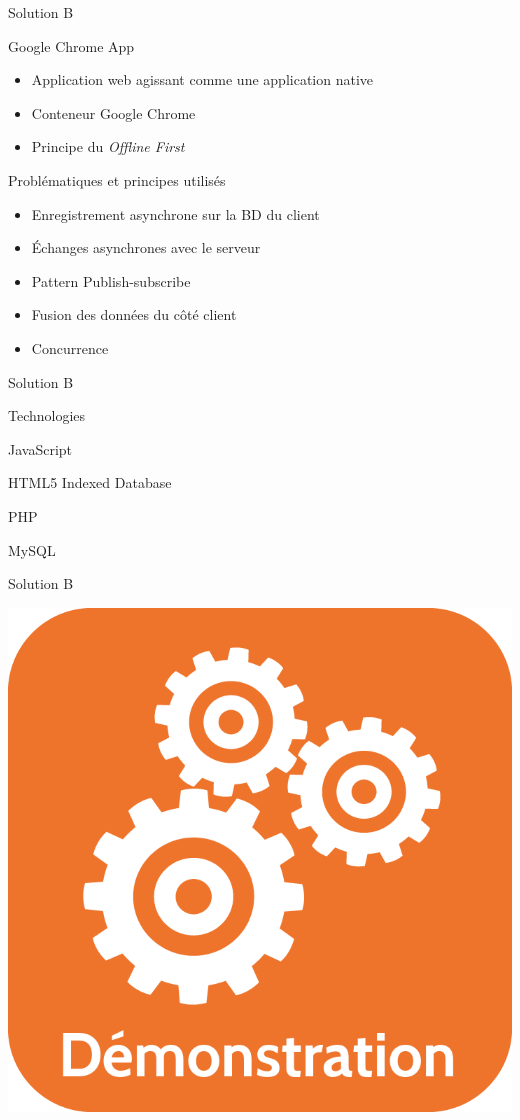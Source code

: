 \author{Nicolas \textsc{Lecompte}}
\begin{frame}{Solution B}
	\begin{block}{Google Chrome App}
		\begin{itemize}
			\item Application web agissant comme une application native
			\item Conteneur Google Chrome
			\item Principe du \textit{Offline First}
		\end{itemize}
	\end{block}
\vfill
\pause
	\begin{block}{Problématiques et principes utilisés}
		\begin{itemize}
			\item Enregistrement asynchrone sur la BD du client
			\item Échanges asynchrones avec le serveur
			\item Pattern Publish-subscribe
			\item Fusion des données du côté client
			\item Concurrence
		\end{itemize}
	\end{block}
\end{frame}

\begin{frame}{Solution B}
 	\begin{block}{Technologies}
		\begin{description}
			\item[Client :] JavaScript
			\item[SGBD client :] HTML5 Indexed Database 
			\item[Serveur :] PHP
			\item[SGBD serveur:] MySQL
		\end{description}
	\end{block}
\end{frame}

\begin{frame}{Solution B}
	\vfill
	\begin{center}
		\includegraphics[scale=0.2]{images/gears-icon.png}
	\end{center}
	\vfill
\end{frame}
